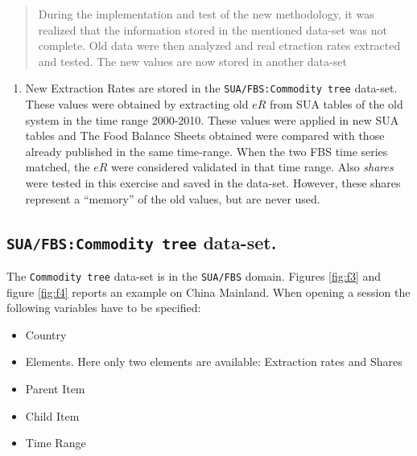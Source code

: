 \documentclass[]{article}
\providecommand{\tightlist}{%
  \setlength{\itemsep}{0pt}\setlength{\parskip}{0pt}}
\begin{document}
\begin{quote}
During the implementation and test of the new methodology, it was
realized that the information stored in the mentioned data-set was not
complete. Old data were then analyzed and real etraction rates extracted
and tested. The new values are now stored in another data-set
\end{quote}

\begin{enumerate}
\def\labelenumi{\arabic{enumi}.}
\setcounter{enumi}{2}
\tightlist
\item
  New Extraction Rates are stored in the
  \texttt{SUA/FBS:Commodity\ tree} data-set. These values were obtained
  by extracting old \(eR\) from SUA tables of the old system in the time
  range 2000-2010. These values were applied in new SUA tables and The
  Food Balance Sheets obtained were compared with those already
  published in the same time-range. When the two FBS time series
  matched, the \(eR\) were considered validated in that time range. Also
  \emph{shares} were tested in this exercise and saved in the data-set.
  However, these shares represent a ``memory'' of the old values, but
  are never used.
\end{enumerate}

\subsection{\texorpdfstring{\texttt{SUA/FBS:Commodity\ tree}
data-set.}{SUA/FBS:Commodity tree data-set.}}\label{suafbscommodity-tree-data-set.}

The \texttt{Commodity\ tree} data-set is in the \texttt{SUA/FBS} domain.
Figures \ref{fig:f3} and figure \ref{fig:f4} reports an example on China
Mainland. When opening a session the following variables have to be
specified:

\begin{itemize}
\tightlist
\item
  Country
\item
  Elements. Here only two elements are available: Extraction rates and
  Shares
\item
  Parent Item
\item
  Child Item
\item
  Time Range
\end{itemize}
\end{document}
